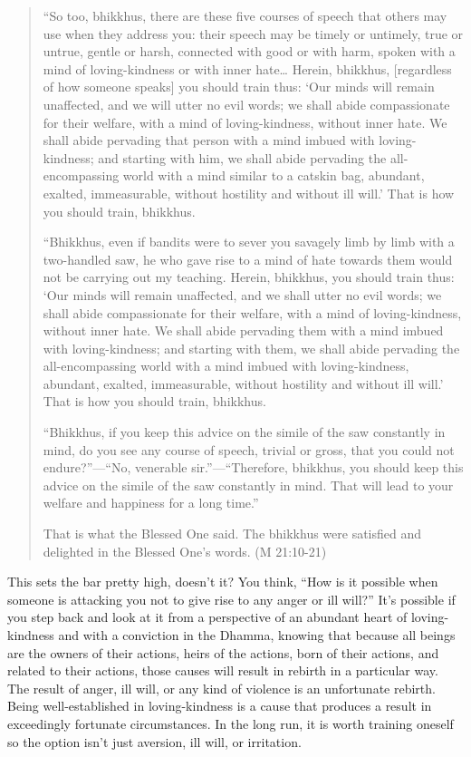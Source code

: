 \begin{quotation}
“So too, bhikkhus, there are these five courses of speech that others
may use when they address you: their speech may be timely or untimely,
true or untrue, gentle or harsh, connected with good or with harm,
spoken with a mind of loving-kindness or with inner hate\ldots{} Herein,
bhikkhus, {[}regardless of how someone speaks{]} you should train thus:
‘Our minds will remain unaffected, and we will utter no evil words; we
shall abide compassionate for their welfare, with a mind of
loving-kindness, without inner hate. We shall abide pervading that
person with a mind imbued with loving-kindness; and starting with him,
we shall abide pervading the all-encompassing world with a mind similar
to a catskin bag, abundant, exalted, immeasurable, without hostility and
without ill will.’ That is how you should train, bhikkhus.

“Bhikkhus, even if bandits were to sever you savagely limb by limb with
a two-handled saw, he who gave rise to a mind of hate towards them would
not be carrying out my teaching. Herein, bhikkhus, you should train
thus: ‘Our minds will remain unaffected, and we shall utter no evil
words; we shall abide compassionate for their welfare, with a mind of
loving-kindness, without inner hate. We shall abide pervading them with
a mind imbued with loving-kindness; and starting with them, we shall
abide pervading the all-encompassing world with a mind imbued with
loving-kindness, abundant, exalted, immeasurable, without hostility and
without ill will.’ That is how you should train, bhikkhus.

“Bhikkhus, if you keep this advice on the simile of the saw constantly
in mind, do you see any course of speech, trivial or gross, that you
could not endure?”—“No, venerable sir.”—“Therefore, bhikkhus, you should
keep this advice on the simile of the saw constantly in mind. That will
lead to your welfare and happiness for a long time.”

That is what the Blessed One said. The bhikkhus were satisfied and
delighted in the Blessed One’s words. (M 21:10-21)
\end{quotation}

This sets the bar pretty high, doesn’t it? You think, “How is it
possible when someone is attacking you not to give rise to any anger or
ill will?” It’s possible if you step back and look at it from a
perspective of an abundant heart of loving-kindness and with a
conviction in the Dhamma, knowing that because all beings are the owners
of their actions, heirs of the actions, born of their actions, and
related to their actions, those causes will result in rebirth in a
particular way. The result of anger, ill will, or any kind of violence
is an unfortunate rebirth. Being well-established in loving-kindness is
a cause that produces a result in exceedingly fortunate circumstances.
In the long run, it is worth training oneself so the option isn’t just
aversion, ill will, or irritation.

